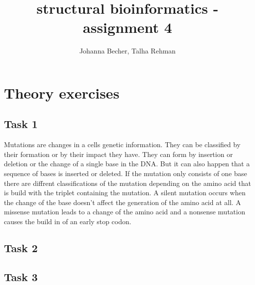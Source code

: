 \documentclass[]{article}
\title{structural bioinformatics - assignment 4}
\author{Johanna Becher, Talha Rehman}
\begin{document}
\maketitle

\section{Theory exercises}
\subsection{Task 1}
Mutations are changes in a cells genetic information. They can be classified by their formation or by their impact they have. \newline
They can form by insertion or deletion or the change of a single base in the DNA. But it can also happen that a sequence of bases is inserted or deleted.\newline
If the mutation only consists of one base there are diffrent classifications of the mutation depending on the amino acid that is build with the triplet containing the mutation.\newline
A silent mutation occurs when the change of the base doesn't affect the generation of the amino acid at all. A missense mutation leads to a change of the amino acid and a nonsense mutation causes the build in of an early stop codon. \newline

\subsection{Task 2}

\subsection{Task 3}
\end{document}
